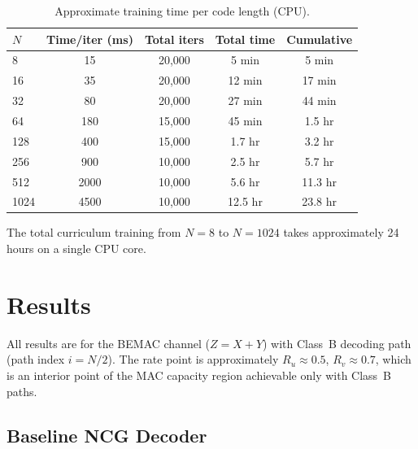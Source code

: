 \documentclass[11pt,a4paper]{article}
\begin{document}
\begin{table}[H]
\centering
\caption{Approximate training time per code length (CPU).}
\label{tab:training_time}
\begin{tabular}{lcccc}
\toprule
$N$ & Time/iter (ms) & Total iters & Total time & Cumulative \\
\midrule
8   & 15   & 20{,}000  & 5 min   & 5 min \\
16  & 35   & 20{,}000  & 12 min  & 17 min \\
32  & 80   & 20{,}000  & 27 min  & 44 min \\
64  & 180  & 15{,}000  & 45 min  & 1.5 hr \\
128 & 400  & 15{,}000  & 1.7 hr  & 3.2 hr \\
256 & 900  & 10{,}000  & 2.5 hr  & 5.7 hr \\
512 & 2000 & 10{,}000  & 5.6 hr  & 11.3 hr \\
1024 & 4500 & 10{,}000 & 12.5 hr & 23.8 hr \\
\bottomrule
\end{tabular}
\end{table}

The total curriculum training from $N = 8$ to $N = 1024$ takes approximately 24 hours on a single CPU core.

\section{Results}
\label{sec:results}

All results are for the BEMAC channel ($Z = X + Y$) with Class~B decoding path (path index $i = N/2$). The rate point is approximately $R_u \approx 0.5$, $R_v \approx 0.7$, which is an interior point of the MAC capacity region achievable only with Class~B paths.

\subsection{Baseline NCG Decoder}
\end{document}
